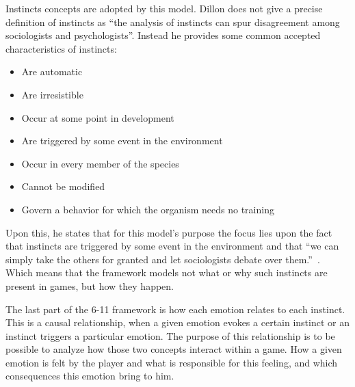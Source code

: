 Instincts concepts are adopted by this model. Dillon does not give a precise definition of instincts as ``the analysis of instincts can spur disagreement among sociologists and psychologists''\citep{dillon_way_2010}. Instead he provides some common accepted characteristics of instincts:
\begin{itemize}
    \item Are automatic
    \item Are irresistible
    \item Occur at some point in development
    \item Are triggered by some event in the environment
    \item Occur in every member of the species
    \item Cannot be modified
    \item Govern a behavior for which the organism needs no 
training
\end{itemize}



Upon this, he states that for this model's purpose the focus lies upon the fact that instincts are triggered by some event in the environment and that ``we can simply take the others for granted and let sociologists debate over them.''~\citep{dillon_way_2010}. Which means that the framework models not what or why such instincts are present in games, but how they happen.

The last part of the 6-11 framework is how each emotion relates to each instinct. This is a causal relationship, when a given emotion evokes a certain instinct or an instinct triggers a particular emotion. The purpose of this relationship is to be possible to analyze how those two concepts interact within a game. How a given emotion is felt by the player and what is responsible for this feeling, and which consequences this emotion bring to him. 

